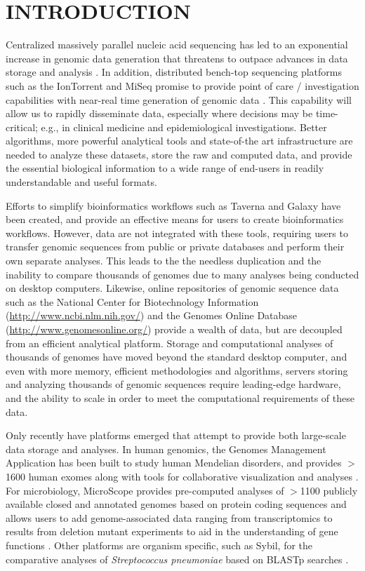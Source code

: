 \documentclass[a4paper,twoside]{article}
\begin{document}
\section{\uppercase{Introduction}}
\label{sec:introduction}

\noindent Centralized massively parallel nucleic acid sequencing has led to an exponential increase in genomic data generation that threatens to outpace advances in data storage and analysis \cite{kahn_future_2011,teeling_current_2012}. In addition, distributed bench-top sequencing platforms such as the IonTorrent and MiSeq promise to provide point of care / investigation capabilities with near-real time generation of genomic data \cite{loman_performance_2012}. This capability will allow us to rapidly disseminate data, especially where decisions may be time-critical; e.g., in clinical medicine and epidemiological investigations. Better algorithms, more powerful analytical tools and state-of-the art infrastructure are needed to analyze these datasets, store the raw and computed data, and provide the essential biological information to a wide range of end-users in readily understandable and useful formats.

Efforts to simplify bioinformatics workflows such as Taverna \cite{lanzen_taverna_2008} and Galaxy \cite{goecks_galaxy:_2010} have been created, and provide an effective means for users to create bioinformatics workflows. However, data are not integrated with these tools, requiring users to transfer genomic sequences from public or private databases and perform their own separate analyses. This leads to the the needless duplication and the inability to compare thousands of genomes due to many analyses being conducted on desktop computers. Likewise, online repositories of genomic sequence data such as the National Center for Biotechnology Information (\url{http://www.ncbi.nlm.nih.gov/}) and the Genomes Online Database (\url{http://www.genomesonline.org/}) provide a wealth of data, but are decoupled from an efficient analytical platform. Storage and computational analyses of thousands of genomes have moved beyond the standard desktop computer, and even with more memory, efficient methodologies and algorithms, servers storing and analyzing thousands of genomic sequences require leading-edge hardware, and the ability to scale in order to meet the computational requirements of these data.

Only recently have platforms emerged that attempt to provide both large-scale data storage and analyses. In human genomics, the Genomes Management Application has been built to study human Mendelian disorders, and provides $>$1600 human exomes along with tools for collaborative visualization and analyses \cite{gonzalez_genomes_2013}. For microbiology, MicroScope provides pre-computed analyses of $>$1100 publicly available closed and annotated genomes based on protein coding sequences and allows users to add genome-associated data ranging from transcriptomics to results from deletion mutant experiments to aid in the understanding of gene functions \cite{vallenet_microscope--integrated_2012}. Other platforms are organism specific, such as Sybil, for the comparative analyses of \textit{Streptococcus pneumoniae} based on BLASTp searches \cite{riley_using_2012}.
\end{document}
